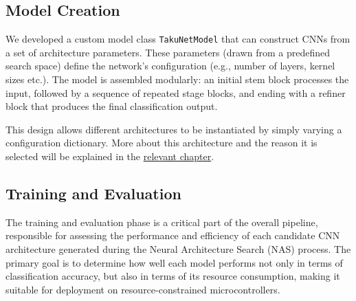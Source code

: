 \subsection*{Model Creation}

We developed a custom model class \texttt{TakuNetModel} that can construct CNNs from a set of architecture parameters. These parameters (drawn from a predefined search space) define the network’s configuration (e.g., number of layers, kernel sizes etc.). The model is assembled modularly: an initial stem block processes the input, followed by a sequence of repeated stage blocks, and ending with a refiner block that produces the final classification output.

This design allows different architectures to be instantiated by simply varying a configuration dictionary. More about this architecture and the reason it is selected will be explained in the \hyperref[chap:Architecture]{relevant chapter}.


\subsection*{Training and Evaluation}



The training and evaluation phase is a critical part of the overall pipeline, responsible for assessing the performance and efficiency of each candidate CNN architecture generated during the Neural Architecture Search (NAS) process. The primary goal is to determine how well each model performs not only in terms of classification accuracy, but also in terms of its resource consumption, making it suitable for deployment on resource-constrained microcontrollers.

